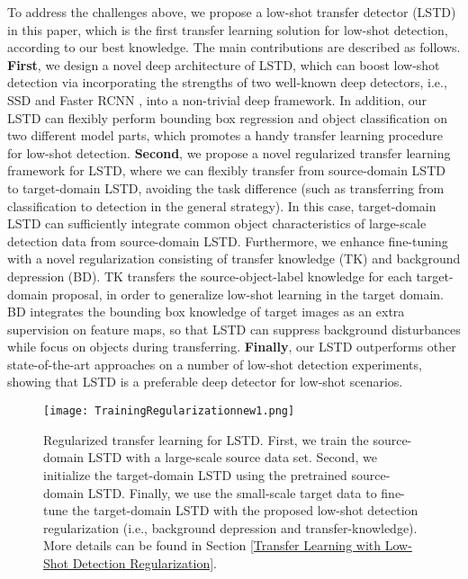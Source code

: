 \documentclass[letterpaper]{article} \usepackage{aaai18}  \usepackage{times}  \usepackage{helvet}  \usepackage{courier}  \usepackage{url}  \usepackage{graphicx}
\begin{document}
To address the challenges above,
we propose a low-shot transfer detector (LSTD) in this paper,
which is the first transfer learning solution for low-shot detection,
according to our best knowledge.
The main contributions are described as follows.
\textbf{First},
we design a novel deep architecture of LSTD,
which can boost low-shot detection via incorporating the strengths of two well-known deep detectors,
i.e., SSD \cite{Liueccv2016} and Faster RCNN \cite{Renpami2016},
into a non-trivial deep framework.
In addition,
our LSTD can flexibly perform bounding box regression and object classification on two different model parts,
which promotes a handy transfer learning procedure for low-shot detection.
\textbf{Second},
we propose a novel regularized transfer learning framework for LSTD,
where we can flexibly transfer from source-domain LSTD to target-domain LSTD,
avoiding the task difference (such as transferring from classification to detection in the general strategy).
In this case,
target-domain LSTD can sufficiently integrate common object characteristics of large-scale detection data from source-domain LSTD.
Furthermore,
we enhance fine-tuning with a novel regularization consisting of transfer knowledge (TK) and background depression (BD).
TK transfers the source-object-label knowledge for each target-domain proposal,
in order to generalize low-shot learning in the target domain.
BD integrates the bounding box knowledge of target images as an extra supervision on feature maps,
so that LSTD can suppress background disturbances while focus on objects during transferring.
\textbf{Finally},
our LSTD outperforms other state-of-the-art approaches on a number of low-shot detection experiments,
showing that LSTD is a preferable deep detector for low-shot scenarios.



\begin{figure*}[t]
\centering
\texttt{[image: TrainingRegularizationnew1.png]}
\caption{Regularized transfer learning for LSTD.
First,
we train the source-domain LSTD with a large-scale source data set.
Second,
we initialize the target-domain LSTD using the pretrained source-domain LSTD.
Finally,
we use the small-scale target data to fine-tune the target-domain LSTD with the proposed low-shot detection regularization
(i.e., background depression and transfer-knowledge).
More details can be found in Section \ref{Transfer Learning with Low-Shot Detection Regularization}.}
\label{Regularization}
\end{figure*}
\end{document}
